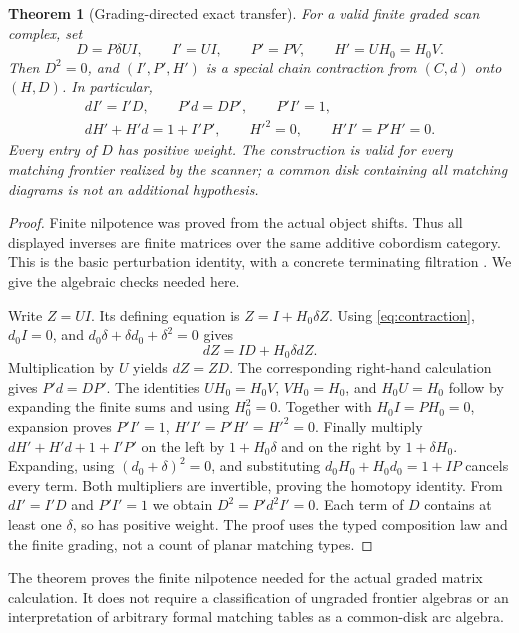 \documentclass[11pt]{article}
\newtheorem{theorem}{Theorem}[section]
\theoremstyle{definition}
\theoremstyle{remark}
\begin{document}
\begin{theorem}[Grading-directed exact transfer]
\label{thm:transfer}
For a valid finite graded scan complex, set
\begin{equation}
 D=P\delta UI,\qquad I'=UI,\qquad P'=PV,\qquad H'=UH_0=H_0V.
 \label{eq:hpl}
\end{equation}
Then $D^2=0$, and $(I',P',H')$ is a special chain contraction from $(C,d)$ onto $(H,D)$. In particular,
\begin{gather}
 dI'=I'D,\qquad P'd=DP',\qquad P'I'=1,\label{eq:newmaps}\\
 dH'+H'd=1+I'P',\qquad H'^2=0,\qquad H'I'=P'H'=0.\label{eq:newhomotopy}
\end{gather}
Every entry of $D$ has positive weight. The construction is valid for every matching frontier realized by the scanner; a common disk containing all matching diagrams is not an additional hypothesis.
\end{theorem}
\begin{proof}
Finite nilpotence was proved from the actual object shifts. Thus all displayed inverses are finite matrices over the same additive cobordism category. This is the basic perturbation identity, with a concrete terminating filtration \cite{real}. We give the algebraic checks needed here.

Write $Z=UI$. Its defining equation is $Z=I+H_0\delta Z$. Using \eqref{eq:contraction}, $d_0I=0$, and $d_0\delta+\delta d_0+\delta^2=0$ gives
\[
 dZ=ID+H_0\delta dZ.
\]
Multiplication by $U$ yields $dZ=ZD$. The corresponding right-hand calculation gives $P'd=DP'$. The identities $UH_0=H_0V$, $VH_0=H_0$, and $H_0U=H_0$ follow by expanding the finite sums and using $H_0^2=0$. Together with $H_0I=PH_0=0$, expansion proves $P'I'=1$, $H'I'=P'H'=H'^2=0$. Finally multiply $dH'+H'd+1+I'P'$ on the left by $1+H_0\delta$ and on the right by $1+\delta H_0$. Expanding, using $(d_0+\delta)^2=0$, and substituting $d_0H_0+H_0d_0=1+IP$ cancels every term. Both multipliers are invertible, proving the homotopy identity. From $dI'=I'D$ and $P'I'=1$ we obtain $D^2=P'd^2I'=0$. Each term of $D$ contains at least one $\delta$, so has positive weight. The proof uses the typed composition law and the finite grading, not a count of planar matching types.
\end{proof}

The theorem proves the finite nilpotence needed for the actual graded matrix calculation. It does not require a classification of ungraded frontier algebras or an interpretation of arbitrary formal matching tables as a common-disk arc algebra.
\end{document}
